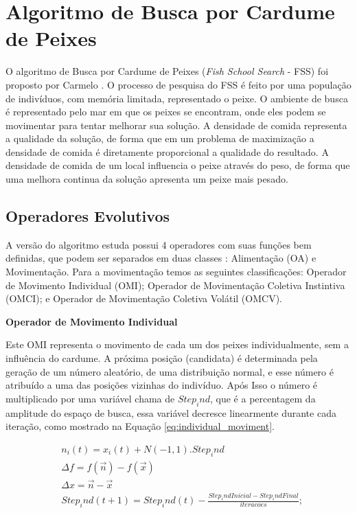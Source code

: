 \section{Algoritmo de Busca por Cardume de Peixes}
\label{sec:fish_school_search}
O algoritmo de Busca por Cardume de Peixes (\textit{Fish School Search} - FSS) foi proposto por Carmelo \cite{carmelo2008novel}. O processo de pesquisa do FSS é feito por uma população de indivíduos, com memória limitada, representado o peixe. O ambiente de busca é representado pelo mar em que os peixes se encontram, onde eles podem se movimentar para tentar melhorar sua solução. A densidade de comida representa a qualidade da solução, de forma que em um problema de maximização a densidade de comida é diretamente proporcional a qualidade do resultado. A densidade de comida de um local influencia o peixe através do peso, de forma que uma melhora continua da solução apresenta um peixe mais pesado.

\subsection{Operadores Evolutivos}
\label{sec:evolutionary_operators}
A versão do algoritmo estuda possui 4 operadores com suas funções bem definidas, que podem ser separados em duas classes \cite{c2009influence}: Alimentação (OA) e Movimentação. Para a movimentação temos as seguintes classificações: Operador de Movimento Individual (OMI); Operador de Movimentação Coletiva Instintiva (OMCI); e Operador de Movimentação Coletiva Volátil (OMCV).

\noindent \textbf{Operador de Movimento Individual}

Este OMI representa o movimento de cada um dos peixes individualmente, sem a influência do cardume. A próxima posição (candidata) é determinada pela geração de um número aleatório, de uma distribuição normal, e esse número é atribuído a uma das posições vizinhas do indivíduo. Após Isso o número é multiplicado por uma variável chama de $Step_ind$, que é a percentagem da amplitude do espaço de busca, essa variável decresce linearmente durante cada iteração, como mostrado na Equação \ref{eq:individual_moviment}.

\begin{equation}
\label{eq:individual_moviment}
\begin{split}
& n_i(t) = x_i(t) + N(-1,1).Step_ind \\
& \Delta f = f(\vec{n}) - f(\vec{x}) \\
& \Delta x = \vec{n} - \vec{x} \\
& Step_ind(t+1) = Step_ind(t) - \frac{Step_indInicial - Step_indFinal}{iteracoes};
\end{split}
\end{equation}


